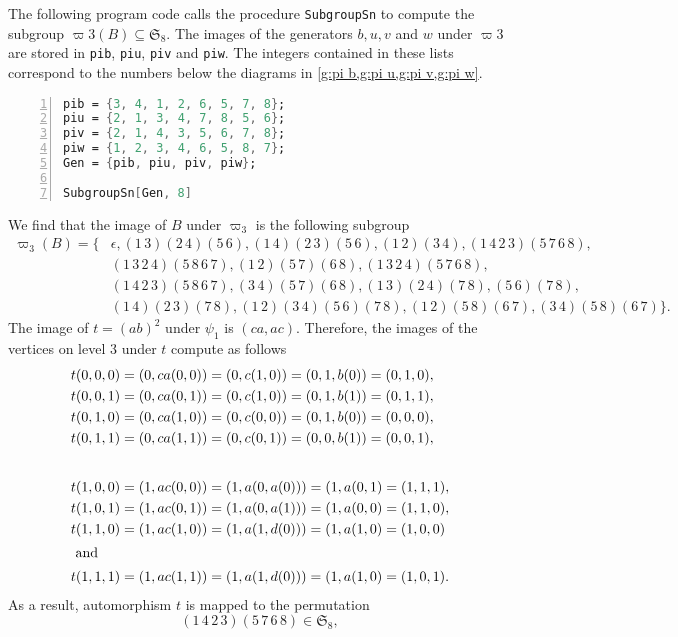 The following program code calls the procedure \verb+SubgroupSn+ to compute the subgroup $\varpi3(B)\subseteq\mathfrak{S}_8$. The images of the generators $b,u,v$ and $w$ under $\varpi3$ are stored in \verb+pib+, \verb+piu+, \verb+piv+ and \verb+piw+. The integers contained in these lists correspond to the numbers below the diagrams in \cref{g:pi b,g:pi u,g:pi v,g:pi w}.
\begin{lstlisting}[language=Mathematica, numbers=left, numberstyle=\tiny, stepnumber=2, numbersep=5pt]
pib = {3, 4, 1, 2, 6, 5, 7, 8};
piu = {2, 1, 3, 4, 7, 8, 5, 6};
piv = {2, 1, 4, 3, 5, 6, 7, 8};
piw = {1, 2, 3, 4, 6, 5, 8, 7};
Gen = {pib, piu, piv, piw};

SubgroupSn[Gen, 8]
\end{lstlisting}
We find that the image of $B$ under $\varpi_3$ is the following subgroup
\begin{align*}
\varpi_3(B)=\lbrace	&\epsilon,(1\, 3)(2\, 4)(5\, 6),   (1\, 4)(2\, 3)(5\, 6), (1\, 2)(3\, 4),   (1\, 4\, 2\, 3)(5\, 7\, 6\, 8),\\
   					&(1\, 3\, 2\, 4)(5\, 8\, 6\, 7),   (1\, 2)(5\, 7)(6\, 8),   (1\, 3\, 2\, 4)(5\, 7\, 6\, 8),\\
   					&(1\, 4\, 2\, 3)(5\, 8\, 6\, 7),   (3\, 4)(5\, 7)(6\, 8), (1\, 3)(2\, 4)(7\, 8),   (5\, 6)(7\, 8),\\
   					&(1\, 4)(2\, 3)(7\, 8),   (1\, 2)(3\, 4)(5\, 6)(7\, 8),   (1\, 2)(5\, 8)(6\, 7), (3\, 4)(5\, 8)(6\, 7)\rbrace.
\end{align*}
The image of $t=(ab)^2$ under $\psi_1$ is $(ca,ac)$. Therefore, the images of the vertices on level 3 under $t$ compute as follows
\begin{align*}
t(0,0,0)&=(0,ca(0,0))=(0,c(1,0))=(0,1,b(0))=(0,1,0),\\
t(0,0,1)&=(0,ca(0,1))=(0,c(1,0))=(0,1,b(1))=(0,1,1),\\
t(0,1,0)&=(0,ca(1,0))=(0,c(0,0))=(0,1,b(0))=(0,0,0),\\
t(0,1,1)&=(0,ca(1,1))=(0,c(0,1))=(0,0,b(1))=(0,0,1),\\[2em]
t(1,0,0)&=(1,ac(0,0))=(1,a(0,a(0)))=(1,a(0,1)=(1,1,1),\\
t(1,0,1)&=(1,ac(0,1))=(1,a(0,a(1)))=(1,a(0,0)=(1,1,0),\\
t(1,1,0)&=(1,ac(1,0))=(1,a(1,d(0)))=(1,a(1,0)=(1,0,0)\\
\intertext{ and}
t(1,1,1)&=(1,ac(1,1))=(1,a(1,d(0)))=(1,a(1,0)=(1,0,1).
\end{align*}
As a result, automorphism $t$ is mapped to the permutation 
\begin{equation*}
(1\,4\,2\,3)(5\,7\,6\,8)\in\mathfrak{S}_8,
\end{equation*}
